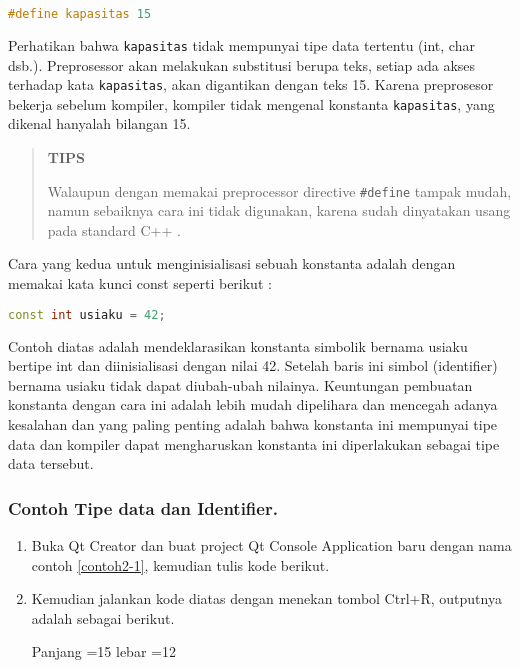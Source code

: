 \begin{lstlisting}[language=c++, numbers=none]
#define kapasitas 15
\end{lstlisting}

Perhatikan bahwa \texttt{kapasitas} tidak mempunyai tipe data tertentu
(int, char dsb.). Preprosessor akan melakukan substitusi berupa teks,
setiap ada akses terhadap kata \texttt{kapasitas}, akan digantikan
dengan teks 15. Karena preprosesor bekerja sebelum kompiler, kompiler
tidak mengenal konstanta \texttt{kapasitas}, yang dikenal hanyalah
bilangan 15.

\begin{quotation}
{\LARGE {}}\textbf{TIPS} 

Walaupun
dengan memakai preprocessor directive \texttt{\#define} tampak mudah,
namun sebaiknya cara ini tidak digunakan, karena sudah dinyatakan usang
pada standard C++ .
\end{quotation}
 

Cara yang kedua untuk menginisialisasi sebuah konstanta adalah dengan
memakai kata kunci const seperti berikut :

\begin{lstlisting}[language=c++, numbers=none]
const int usiaku = 42;
\end{lstlisting}

Contoh diatas adalah mendeklarasikan konstanta simbolik bernama usiaku
bertipe int dan diinisialisasi dengan nilai 42. Setelah baris ini simbol
(identifier) bernama usiaku tidak dapat diubah-ubah nilainya. Keuntungan
pembuatan konstanta dengan cara ini adalah lebih mudah dipelihara dan
mencegah adanya kesalahan dan yang paling penting adalah bahwa konstanta
ini mempunyai tipe data dan kompiler dapat mengharuskan konstanta ini
diperlakukan sebagai tipe data tersebut.

\subsubsection*{Contoh Tipe data dan Identifier.}

\begin{enumerate}

\item
  Buka Qt Creator dan buat project Qt Console Application baru dengan
  nama contoh \ref{contoh2-1}, kemudian tulis kode berikut.



\item
  Kemudian jalankan kode diatas dengan menekan tombol Ctrl+R, outputnya
  adalah sebagai berikut.

\begin{lcverbatim}
Panjang =15
lebar =12
\end{lcverbatim}

\end{enumerate}



